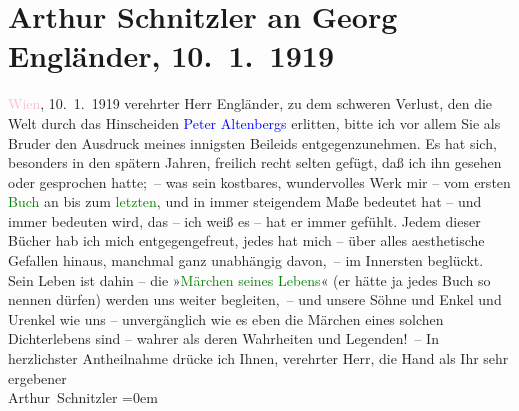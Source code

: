

               \section[Arthur Schnitzler an Georg Engländer, 10. 1. 1919]{ Arthur Schnitzler an Georg Engländer, 10. 1. 1919}\nopagebreak{}\rehead{ }\normalsize\beginnumbering{} \toendnotes[C]{\smallbreak\pagebreak[2]} 
\toendnotes[C]{\smallbreak}\pstart
           \raggedleft{}{\pb}\textcolor{pink}{Wien}{}\ledrightnote{\textcolor{pink}{Wien}}, 10. 1. 1919\pend
           \pstart{}verehrter Herr Engländer,\pend\pstart
           zu dem schweren Verlust, den die Welt durch das Hinscheiden \textcolor{blue}{Peter Altenbergs}{}\ledrightnote{\textcolor{blue}{Peter Altenberg}} erlitten, bitte ich vor allem Sie als
                    Bruder den Ausdruck meines innigsten Beileids entgegenzunehmen. Es hat sich,
                    besonders in den spätern Jahren, freilich recht selten gefügt, daß ich ihn
                    gesehen oder gesprochen hatte; – was sein kostbares, wundervolles Werk mir – vom
                    ersten \textcolor{green}{Buch}{} an bis zum \textcolor{green}{letzten}{}, und in immer
                    steigendem Maße bedeutet hat – und immer bedeuten wird, das – ich weiß es – hat
                    er immer gefühlt. Jedem dieser Bücher hab ich mich entgegengefreut, jedes hat
                    mich – über alles aesthetische Gefallen hinaus, manchmal ganz unabhängig
                    davon, – im Innersten beglückt. Sein Leben ist dahin – die »\textcolor{green}{Märchen seines Lebens}{}« (er hätte ja
                    jedes Buch so nennen dürfen) werden uns weiter begleiten, – und unsere Söhne und
                    Enkel und Urenkel wie uns – unvergänglich wie es eben die Märchen eines solchen
                    Dichterlebens sind – wahrer als deren Wahrheiten und Legenden! –\pend
           \pstart
           In herzlichster Antheilnahme drücke ich Ihnen, verehrter Herr, die Hand als
                    Ihr sehr ergebener{\\[\baselineskip]}\spacefill\mbox{Arthur Schnitzler}\pend
           \leftskip=0em{}\endnumbering{}  
      